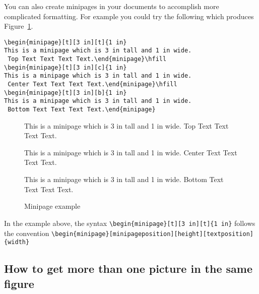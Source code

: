 You can also create minipages in your documents to accomplish more complicated formatting. For example you could try the following which produces Figure~\ref{Fig2}.
\begin{singlespace}\small
\begin{verbatim}
\begin{minipage}[t][3 in][t]{1 in}
This is a minipage which is 3 in tall and 1 in wide.
 Top Text Text Text Text.\end{minipage}\hfill
\begin{minipage}[t][3 in][c]{1 in}
This is a minipage which is 3 in tall and 1 in wide.
 Center Text Text Text Text.\end{minipage}\hfill
\begin{minipage}[t][3 in][b]{1 in}
This is a minipage which is 3 in tall and 1 in wide.
 Bottom Text Text Text Text.\end{minipage}
\end{verbatim}
\end{singlespace}

\begin{figure}[!htb]
\begin{minipage}[t][3 in][t]{1 in}
This is a minipage which is 3 in tall and 1 in wide. Top Text Text Text Text.
\end{minipage}
\hfill
\begin{minipage}[t][3 in][c]{1 in} This is a minipage which is 3 in tall and 1 in wide. Center Text Text Text Text.
\end{minipage}
\hfill
\begin{minipage}[t][3 in][b]{1 in}
This is a minipage which is 3 in tall and 1 in wide. Bottom Text Text Text Text.
\end{minipage}
\caption{Minipage example}\label{Fig2}
\end{figure}

In the example above, the syntax \verb|\begin{minipage}[t][3 in][t]{1 in}| follows the convention \linebreak\verb|\begin{minipage}[minipageposition][height][textposition]{width}|

\subsection[Two pictures in one figure]{How to get more than one picture in the same figure}

